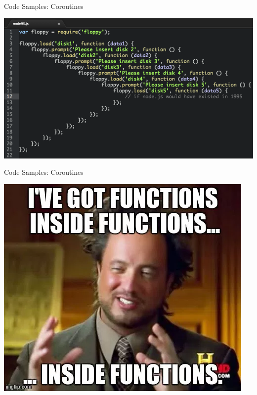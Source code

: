 \begin{frame}[fragile]{Code Samples: Coroutines}
	\begin{center}
		\includegraphics[width=0.75\paperwidth]{figures/functionsInFunctionsFail}
	\end{center}
\end{frame}

\begin{frame}[fragile]{Code Samples: Coroutines}
	\begin{center}
		\includegraphics[width=0.5\paperwidth]{figures/functionsInFunctionsMeme}
	\end{center}
\end{frame}

